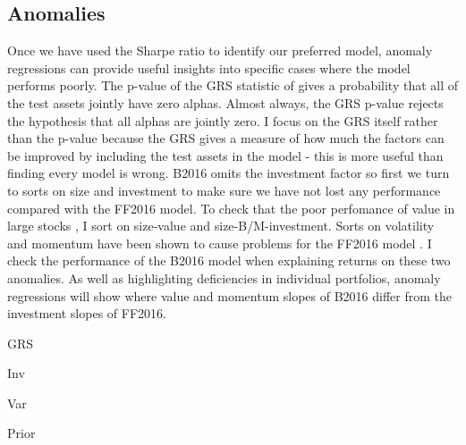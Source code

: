 
\subsection{Anomalies}

Once we have used the Sharpe ratio to identify our preferred model, anomaly regressions
can provide useful insights into specific cases where the model performs poorly. The
p-value of the GRS statistic of \textcite{gibbons1989test} gives a probability that all of
the test assets jointly have zero alphas. Almost always, the GRS p-value rejects the
hypothesis that all alphas are jointly zero. I focus on the GRS itself rather than the
p-value because the GRS gives a measure of how much the factors can be improved by
including the test assets in the model - this is more useful than finding every model is
wrong. B2016 omits the investment factor so first we turn to sorts on size and investment
to make sure we have not lost any performance compared with the FF2016 model. To check
that the poor perfomance of value in large stocks \parencite{asness2015fact}, I sort on
size-value and size-B/M-investment. Sorts on volatility \parencite{ang2006cross} and
momentum \parencite{jegadeesh1993returns} have been shown to cause problems for the FF2016
model \parencite{fama2016dissecting}. I check the performance of the B2016 model when
explaining returns on these two anomalies. As well as highlighting deficiencies in
individual portfolios, anomaly regressions will show where value and momentum slopes of
B2016 differ from the investment slopes of FF2016.

{GRS}

{Inv}


{Var}

{Prior}
